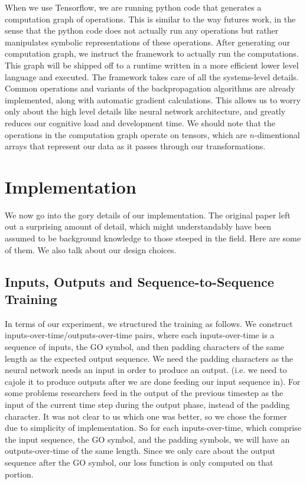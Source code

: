 \documentclass[12pt]{article}
\begin{document}
When we use Tensorflow, we are running python code that generates a computation
graph of operations. This is similar to the way futures work, in the sense
that the python code does not actually run any operations but rather
manipulates symbolic representations of these operations. After generating
our computation graph, we instruct the framework to actually run the computations.
This graph will be shipped off to a runtime written in a more efficient lower level
language and executed. The framework takes care of all the systems-level details.
Common operations and variants of the backpropagation algorithms are already implemented,
along with automatic gradient calculations. This allows us to worry only about the
high level details like neural network architecture, and greatly reduces our cognitive
load and development time. We should note that the operations in the computation graph
operate on tensors, which are $n$-dimentional arrays that represent our data as
it passes through our transformations.

\section{Implementation}\label{implementation}

We now go into the gory details of our implementation. The original paper left out
a surprising amount of detail, which might understandably have been
assumed to be background knowledge to those steeped in the field. Here are
some of them. We also talk about our design choices.

\subsection{Inputs, Outputs and Sequence-to-Sequence Training}

In terms of our experiment, we structured the training as follows. We
construct inputs-over-time/outputs-over-time pairs, where each inputs-over-time
is a sequence of inputs, the GO symbol, and then padding characters of the same length as the
expected output sequence. We need the padding characters as the neural network needs an input in order to
produce an output. (i.e. we need to cajole it to produce outputs after we are done
feeding our input sequence in). For some problems researchers feed in the output of the previous
timestep as the input of the current time step during the output phase,
instead of the padding character.
It was not clear to us which one was better, so
we chose the former due to simplicity of implementation. So for each inputs-over-time,
which comprise the input sequence, the GO symbol, and the padding symbols,
we will have an outputs-over-time of the same length.
Since we only care about the output sequence after the GO symbol,
our loss function is only computed on that portion.
\end{document}
